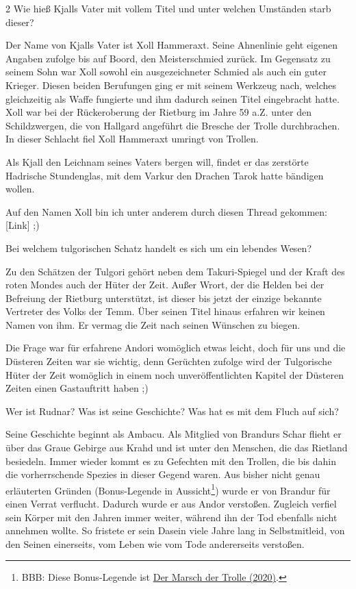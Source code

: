 \documentclass[10pt, a4paper, oneside]{book}
\begin{document}
\begin{multicols}{2}
Wie hieß Kjalls Vater mit vollem Titel und unter welchen Umständen starb dieser?\bigskip

Der Name von Kjalls Vater ist Xoll Hammeraxt. Seine Ahnenlinie geht eigenen Angaben zufolge bis auf Boord, den Meisterschmied zurück. Im Gegensatz zu seinem Sohn war Xoll sowohl ein ausgezeichneter Schmied als auch ein guter Krieger. Diesen beiden Berufungen ging er mit seinem Werkzeug nach, welches gleichzeitig als Waffe fungierte und ihm dadurch seinen Titel eingebracht hatte. Xoll war bei der Rückeroberung der Rietburg im Jahre 59 a.Z. unter den Schildzwergen, die von Hallgard angeführt die Bresche der Trolle durchbrachen. In dieser Schlacht fiel Xoll Hammeraxt umringt von Trollen.

Als Kjall den Leichnam seines Vaters bergen will, findet er das zerstörte Hadrische Stundenglas, mit dem Varkur den Drachen Tarok hatte bändigen wollen.

Auf den Namen Xoll bin ich unter anderem durch diesen Thread gekommen: [Link] ;)\bigskip

Bei welchem tulgorischen Schatz handelt es sich um ein lebendes Wesen?\bigskip

Zu den Schätzen der Tulgori gehört neben dem Takuri-Spiegel und der Kraft des roten Mondes auch der Hüter der Zeit. Außer Wrort, der die Helden bei der Befreiung der Rietburg unterstützt, ist dieser bis jetzt der einzige bekannte Vertreter des Volks der Temm. Über seinen Titel hinaus erfahren wir keinen Namen von ihm. Er vermag die Zeit nach seinen Wünschen zu biegen.

Die Frage war für erfahrene Andori womöglich etwas leicht, doch für uns und die Düsteren Zeiten war sie wichtig, denn Gerüchten zufolge wird der Tulgorische Hüter der Zeit womöglich in einem noch unveröffentlichten Kapitel der Düsteren Zeiten einen Gastauftritt haben ;)\bigskip

Wer ist Rudnar? Was ist seine Geschichte? Was hat es mit dem Fluch auf sich?\bigskip

Seine Geschichte beginnt als Ambacu. Als Mitglied von Brandurs Schar flieht er über das Graue Gebirge aus Krahd und ist unter den Menschen, die das Rietland besiedeln. Immer wieder kommt es zu Gefechten mit den Trollen, die bis dahin die vorherrschende Spezies in dieser Gegend waren. Aus bisher nicht genau erläuterten Gründen (Bonus-Legende in Aussicht\footnote{BBB: Diese Bonus-Legende ist \hyperref[legende-2020-der-marsch-der-trolle]{Der Marsch der Trolle (2020)}.}) wurde er von Brandur für einen Verrat verflucht. Dadurch wurde er aus Andor verstoßen. Zugleich verfiel sein Körper mit den Jahren immer weiter, während ihn der Tod ebenfalls nicht annehmen wollte. So fristete er sein Dasein viele Jahre lang in Selbstmitleid, von den Seinen einerseits, vom Leben wie vom Tode andererseits verstoßen.


\end{multicols}
\end{document}
